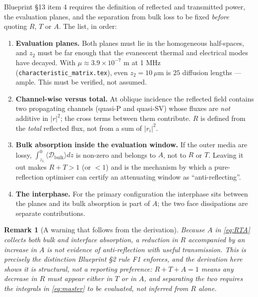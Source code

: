 \documentclass[11pt]{article}
\theoremstyle{plain}
\newtheorem{remark}{Remark}
\begin{document}
Blueprint \S13 item 4 requires the definition of reflected and transmitted power,
the evaluation planes, and the separation from bulk loss to be fixed
\emph{before} quoting $R$, $T$ or $A$. The list, in order:
\begin{enumerate}
  \item \textbf{Evaluation planes.} Both planes must lie in the homogeneous
        half-spaces, and $z_2$ must be far enough that the evanescent thermal and
        electrical modes have decayed. With $\mu\approx3.9\times10^{-7}$ m at
        1 MHz (\texttt{characteristic\_matrix.tex}), even $z_2=10\ \mu\mathrm{m}$
        is $25$ diffusion lengths --- ample. This must be verified, not assumed.
  \item \textbf{Channel-wise versus total.} At oblique incidence the reflected
        field contains two propagating channels (quasi-P and quasi-SV) whose
        fluxes are \emph{not} additive in $\lvert r\rvert^2$; the cross terms
        between them contribute. $R$ is defined from the \emph{total} reflected
        flux, not from a sum of $\lvert r_i\rvert^2$.
  \item \textbf{Bulk absorption inside the evaluation window.} If the outer media
        are lossy, $\int_{z_1}^{0}\langle\mathcal{D}_{\text{bulk}}\rangle dz$ is
        non-zero and belongs to $A$, not to $R$ or $T$. Leaving it out makes
        $R+T>1$ (or $<1$) and is the mechanism by which a pure-reflection
        optimiser can certify an attenuating window as ``anti-reflecting''.
  \item \textbf{The interphase.} For the primary configuration the interphase
        sits between the planes and its bulk absorption is part of $A$; the two
        face dissipations are separate contributions.
\end{enumerate}

\begin{remark}[A warning that follows from the derivation]
\label{rem:warning}
Because $A$ in \eqref{eq:RTA} collects both bulk and interface absorption,
a reduction in $R$ accompanied by an increase in $A$ is \emph{not} evidence of
anti-reflection with useful transmission. This is precisely the distinction
Blueprint \S2 rule F1 enforces, and the derivation here shows it is structural,
not a reporting preference: $R+T+A=1$ means any decrease in $R$ must appear
either in $T$ or in $A$, and separating the two requires the integrals in
\eqref{eq:master} to be evaluated, not inferred from $R$ alone.
\end{remark}
\end{document}
